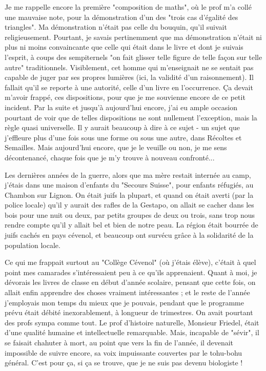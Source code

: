 Je me rappelle encore la première "composition de maths", où le prof m’a collé une mauvaise note, pour la démonstration d’un des "trois cas d’égalité des triangles". Ma démonstration n’était pas celle du bouquin, qu’il suivait religieusement. Pourtant, je savais pertinemment que ma démonstration n’était ni plus ni moins convaincante que celle qui était dans le livre et dont je suivais l’esprit, à coups des sempiternels "on fait glisser telle figure de telle façon sur telle autre" traditionnels. Visiblement, cet homme qui m’enseignait ne se sentait pas capable de juger par ses propres lumières (ici, la validité d’un raisonnement). Il fallait qu’il se reporte à une autorité, celle d’un livre en l’occurrence. Ça devait m’avoir frappé, ces dispositions, pour que je me souvienne encore de ce petit incident. Par la suite et jusqu’à aujourd’hui encore, j’ai eu ample occasion pourtant de voir que de telles dispositions ne sont nullement l’exception, mais la règle quasi universelle. Il y aurait beaucoup à dire à ce sujet - un sujet que j’effleure plus d’une fois sous une forme ou sous une autre, dans Récoltes et Semailles. Mais aujourd’hui encore, que je le veuille ou non, je me sens décontenancé, chaque fois que je m’y trouve à nouveau confronté...

Les dernières années de la guerre, alors que ma mère restait internée au camp, j’étais dans une maison d’enfants du "Secours Suisse", pour enfants réfugiés, au Chambon sur Lignon. On était juifs la plupart, et quand on était averti (par la police locale) qu’il y aurait des rafles de la Gestapo, on allait se cacher dans les bois pour une nuit ou deux, par petits groupes de deux ou trois, sans trop nous rendre compte qu’il y allait bel et bien de notre peau. La région était bourrée de juifs cachés en pays cévenol, et beaucoup ont survécu grâce à la solidarité de la population locale.

Ce qui me frappait surtout au "Collège Cévenol" (où j’étais élève), c’était à quel point mes camarades s’intéressaient peu à ce qu’ils apprenaient. Quant à moi, je dévorais les livres de classe en début d’année scolaire, pensant que cette fois, on allait enfin apprendre des choses vraiment intéressantes ; et le reste de l’année j’employais mon temps du mieux que je pouvais, pendant que le programme prévu était débité inexorablement, à longueur de trimestres. On avait pourtant des profs sympa comme tout. Le prof d’histoire naturelle, Monsieur Friedel, était d’une qualité humaine et intellectuelle remarquable. Mais, incapable de "sévir", il se faisait chahuter à mort, au point que vers la fin de l’année, il devenait impossible de suivre encore, sa voix impuissante couvertes par le tohu-bohu général. C’est pour ça, si ça se trouve, que je ne suis pas devenu biologiste !


